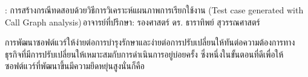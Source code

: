 
\begin{abstractquote}
\studentname : การสร้างกรณีทดสอบด้วยวิธีการวิเคราะห์แผนภาพการเรียกใช้งาน (Test case generated with Call Graph analysis)\,อาจารย์ที่ปรึกษา: รองศาสตร์ ดร. ธาราทิพย์ สุวรรณศาสตร์
\end{abstractquote}

การพัฒนาซอฟต์แวร์ให้ง่ายต่อการบำรุงรักษาและง่ายต่อการปรับเปลี่ยนให้ทันต่อความต้องการทางธุรกิจที่มีการปรับเปลี่ยนให้เหมาะสมกับการดำเนินการอยู่บ่อยครั้ง ซึ่งหนึ่งในขั้นตอนที่ดีเพื่อให้ซอฟต์แวร์ที่พัฒนาขึ้นมีความยึดหยุ่นสูงนั่นก็คือ
